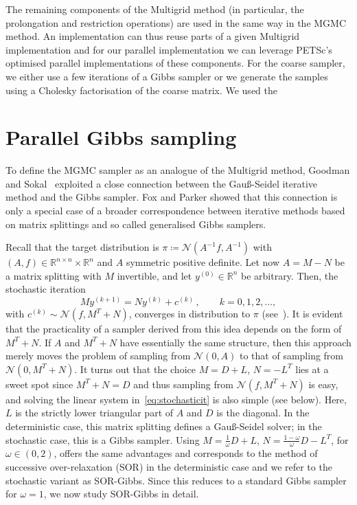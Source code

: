 \documentclass[
fontsize=11pt,
paper=a4,
numbers=noenddot
]{scrartcl}
\begin{document}
The remaining components of the Multigrid method (in particular, the prolongation and restriction operations) are used in the same way in the MGMC method. An implementation can thus reuse parts of a given Multigrid implementation and for our parallel implementation we can leverage PETSc's optimised parallel implementations of these components. For the coarse sampler, we either use a few iterations of a Gibbs sampler or we generate the samples using a Cholesky factorisation of the coarse matrix. We used the 

\section{Parallel Gibbs sampling}
To define the MGMC sampler as an analogue of the Multigrid method, Goodman and Sokal~\cite{goodmansokal} exploited a close connection between the Gauß-Seidel iterative method and the Gibbs sampler. Fox and Parker showed that this connection is only a special case of a broader correspondence between iterative methods based on matrix splittings and so called generalised Gibbs samplers.

Recall that the target distribution is $\pi \coloneqq \mathcal{N}(A^{-1}f, A^{-1})$ with $(A, f) \in \mathbb{R}^{n \times n} \times \mathbb{R}^n$ and $A$ symmetric positive definite. Let now $A = M - N$ be a matrix splitting with $M$ invertible, and let $y^{(0)} \in \mathbb{R}^n$ be arbitrary. Then, the stochastic iteration
\begin{equation}
    \label{eq:stochasticit}
    M y^{(k+1)} = N y^{(k)} + c^{(k)}\,,\qquad k = 0,1,2, \dotsc,
\end{equation}
with $c^{(k)} \sim \mathcal{N}(f, M^T + N)$, converges in distribution to $\pi$ (see~\cite[Thm.\ 2 and Cor.\ 4]{foxparker}). It is evident that the practicality of a sampler derived from this idea depends on the form of $M^T + N$. If $A$ and $M^T + N$ have essentially the same structure, then this approach merely moves the problem of sampling from $\mathcal{N}(0, A)$ to that of sampling from $\mathcal{N}(0, M^T + N)$. It turns out that the choice $M = D + L$, $N = -L^T$ lies at a sweet spot since $M^T + N = D$ and thus sampling from $\mathcal{N}(f, M^T + N)$ is easy, and solving the linear system in~\eqref{eq:stochasticit} is also simple (see below). Here, $L$ is the strictly lower triangular part of $A$ and $D$ is the diagonal. In the deterministic case, this matrix splitting defines a Gauß-Seidel solver; in the stochastic case, this is a Gibbs sampler. Using $M = \frac{1}{\omega} D + L$, $N = \frac{1-\omega}{\omega} D - L^T$, for $\omega \in (0,2)$, offers the same advantages and corresponds to the method of successive over-relaxation (SOR) in the deterministic case and we refer to the stochastic variant as SOR-Gibbs. Since this reduces to a standard Gibbs sampler for $\omega = 1$, we now study SOR-Gibbs in detail.
\end{document}
